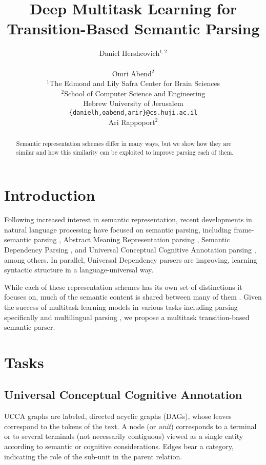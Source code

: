 \documentclass[11pt,a4paper]{article}
\title{Deep Multitask Learning for Transition-Based Semantic Parsing}
\author{Daniel Hershcovich$^{1,2}$ \\
  \\\And
  Omri Abend$^2$ \\
  $^1$The Edmond and Lily Safra Center for Brain Sciences \\
  $^2$School of Computer Science and Engineering \\
  Hebrew University of Jerusalem \\
  \texttt{\{danielh,oabend,arir\}@cs.huji.ac.il}
  \\\And
  Ari Rappoport$^2$
}
\date{}
\begin{document}
\maketitle
\begin{abstract}
  Semantic representation schemes differ in many ways, but we show
  how they are similar and how this similarity can be exploited to
  improve parsing each of them.
\end{abstract}

\section{Introduction}\label{sec:introduction}

Following increased interest in semantic representation,
recent developments in natural language processing have focused on semantic parsing,
including frame-semantic parsing \cite{gildea2002automatic,swayamdipta2017frame,ringgaard2017sling},
Abstract Meaning Representation parsing \cite{damonte-17,11099},
Semantic Dependency Parsing \cite{P17-1186}, and
Universal Conceptual Cognitive Annotation parsing \cite{hershcovich2017a}, among others.
In parallel, Universal Dependency parsers \cite{dozat2016deep} are improving,
learning syntactic structure in a language-universal way.

While each of these representation schemes has its own set of distinctions it focuses on,
much of the semantic content is shared between many of them \cite{abend2017the}.
Given the success of multitask learning models in various tasks
\cite{luong2015multi,ruder2017overview}
including parsing specifically
\cite{Zhang2016StackpropagationIR,P17-1186,swayamdipta2017frame,guo2016exploiting}
and multilingual parsing \cite{TACL892},
we propose a multitask transition-based semantic parser.


\section{Tasks}\label{sec:tasks}

\subsection{Universal Conceptual Cognitive Annotation}\label{sec:ucca}

UCCA graphs are labeled, directed acyclic graphs (DAGs),
whose leaves correspond to the tokens of
the text. A node (or {\it unit}) corresponds to a terminal or
to several terminals (not necessarily contiguous) viewed as a
single entity according to semantic or cognitive considerations.
Edges bear a category, indicating the role of the sub-unit in the parent relation.
\end{document}
